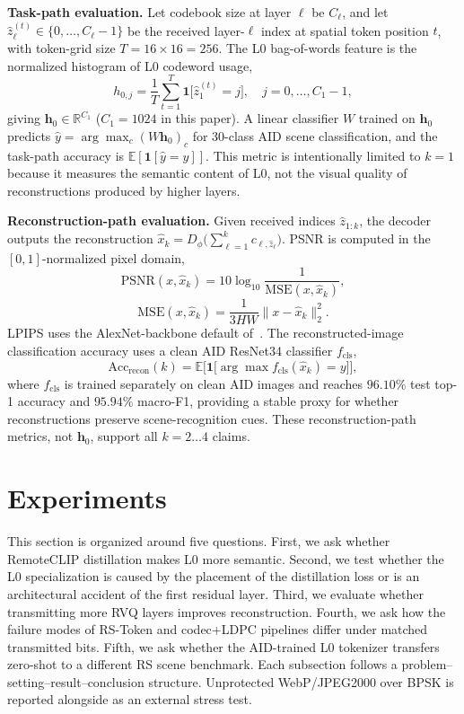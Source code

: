 \documentclass[lettersize,journal]{IEEEtran}
\begin{document}
\textbf{Task-path evaluation.} Let codebook size at layer $\ell$ be $C_\ell$, and let $\hat{z}_\ell^{(t)}\in\{0,\ldots,C_\ell-1\}$ be the received layer-$\ell$ index at spatial token position $t$, with token-grid size $T = 16\times 16 = 256$. The L0 bag-of-words feature is the normalized histogram of L0 codeword usage,
\begin{equation}
    h_{0,j} = \frac{1}{T}\sum_{t=1}^{T} \mathbf{1}\!\bigl[\hat{z}_1^{(t)} = j\bigr], \quad j=0,\ldots,C_1-1,
\end{equation}
giving $\mathbf{h}_0\in\mathbb{R}^{C_1}$ ($C_1 = 1024$ in this paper). A linear classifier $W$ trained on $\mathbf{h}_0$ predicts $\hat{y} = \arg\max_c (W\mathbf{h}_0)_c$ for 30-class AID scene classification, and the task-path accuracy is $\mathbb{E}[\mathbf{1}[\hat{y}=y]]$. This metric is intentionally limited to $k=1$ because it measures the semantic content of L0, not the visual quality of reconstructions produced by higher layers.

\textbf{Reconstruction-path evaluation.} Given received indices $\hat{z}_{1:k}$, the decoder outputs the reconstruction $\hat{x}_k = D_\phi\!\bigl(\sum_{\ell=1}^{k} c_{\ell, \hat{z}_\ell}\bigr)$. PSNR is computed in the $[0,1]$-normalized pixel domain,
\begin{equation}
    \mathrm{PSNR}(x,\hat{x}_k) = 10\log_{10}\frac{1}{\mathrm{MSE}(x,\hat{x}_k)},
\end{equation}
\begin{equation}
    \mathrm{MSE}(x,\hat{x}_k) = \frac{1}{3HW}\|x-\hat{x}_k\|_2^2.
\end{equation}
LPIPS uses the AlexNet-backbone default of~\cite{zhang2018lpips}. The reconstructed-image classification accuracy uses a clean AID ResNet34 classifier $f_{\mathrm{cls}}$,
\begin{equation}
    \mathrm{Acc}_{\mathrm{recon}}(k) = \mathbb{E}\bigl[\mathbf{1}\!\bigl[\arg\max f_{\mathrm{cls}}(\hat{x}_k) = y\bigr]\bigr],
\end{equation}
where $f_{\mathrm{cls}}$ is trained separately on clean AID images and reaches $96.10\%$ test top-1 accuracy and $95.94\%$ macro-F1, providing a stable proxy for whether reconstructions preserve scene-recognition cues. These reconstruction-path metrics, not $\mathbf{h}_0$, support all $k=2\ldots 4$ claims.

\section{Experiments}
This section is organized around five questions. First, we ask whether RemoteCLIP distillation makes L0 more semantic. Second, we test whether the L0 specialization is caused by the placement of the distillation loss or is an architectural accident of the first residual layer. Third, we evaluate whether transmitting more RVQ layers improves reconstruction. Fourth, we ask how the failure modes of RS-Token and codec+LDPC pipelines differ under matched transmitted bits. Fifth, we ask whether the AID-trained L0 tokenizer transfers zero-shot to a different RS scene benchmark. Each subsection follows a problem--setting--result--conclusion structure. Unprotected WebP/JPEG2000 over BPSK is reported alongside as an external stress test.
\end{document}
